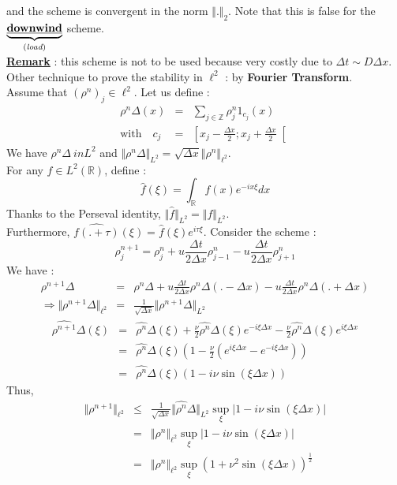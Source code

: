 \documentclass{report}
\newcommand{\R}{\ensuremath{\mathbb{R}}} %
\theoremstyle{plain}
\theoremstyle{definition}
\theoremstyle{remark}
\begin{document}
and the scheme is convergent in the norm $\Vert . \Vert_2$.
Note that this is false for the $\underbrace{\textbf{\underline{downwind}}}_{(\textit{load})}$ scheme.\\
\underline{\textbf{Remark}} : this scheme is not to be used because very costly due to $\Delta t \sim D\Delta x$.
Other technique to prove the stability in $\ell^2$ : by \textbf{Fourier Transform}.\\
Assume that $(\rho^n)_j \in \ell^2$.
Let us define : 
\begin{eqnarray}
\rho^n \Delta(x) &=& \sum_{j \in \mathbb{Z}} \rho^n_j \mathrm{1}_{c_j}(x) \\
\text{with}\quad c_j &=& \left[x_j - \frac{\Delta x}{2}; x_j + \frac{\Delta x}{2}\right[
\end{eqnarray}
We have $\rho^n \Delta \ in L^2$ and $\Vert \rho^n\Delta \Vert_{L^2} = \sqrt{\Delta x} \Vert \rho ^n \Vert_{\ell^2}$. \\
For any $f \in L^2(\R)$, define :
\begin{equation}
\hat{f}(\xi) = \int_{\R}f(x)e^{-ix\xi} dx
\end{equation}
Thanks to the Perseval identity, $\Vert \hat{f} \Vert_{L^2} =  \Vert f \Vert_{L^2}$.\\
Furthermore, $\hat{f(.+\tau)}(\xi) = \hat{f}(\xi)e^{i\tau\xi}$.
Consider the scheme :
\begin{equation}
\rho_j^{n+1} = \rho^n_j + u\frac{\Delta t}{2\Delta x}\rho^n_{j-1} - u\frac{\Delta t}{2\Delta x}\rho^n_{j+1} 
\end{equation}
We have :
\begin{eqnarray}
\rho^{n+1}\Delta &=& \rho^{n}\Delta + u\frac{\Delta t}{2\Delta x}\rho^n\Delta(.-\Delta x) - u\frac{\Delta t}{2\Delta x}\rho^n\Delta(.+\Delta x)\\
\Rightarrow \Vert \rho^{n+1}\Delta \Vert_{\ell^2} &=& \frac{1}{\sqrt{\Delta x}}\Vert \rho^{n+1}\Delta\Vert_{L^2} 
\end{eqnarray}
\begin{eqnarray}
\hat{\rho^{n+1}}\Delta(\xi) &=& \hat{\rho^{n}}\Delta(\xi) + \frac{\nu}{2}\hat{\rho^{n}}\Delta(\xi)e^{-i\xi\Delta x} - \frac{\nu}{2}\hat{\rho^{n}}\Delta(\xi)e^{i\xi\Delta x}\\
&=& \hat{\rho^n}\Delta(\xi)\left(1 - \frac{\nu}{2}(e^{i\xi\Delta x}-e^{-i\xi\Delta x})\right) \\
&=& \hat{\rho^n}\Delta(\xi)\left(1 - i\nu \sin(\xi\Delta x)\right)
\end{eqnarray} 
Thus, 
\begin{eqnarray}
\Vert \rho^{n+1} \Vert_{\ell^2} &\le & \frac{1}{\sqrt{\Delta x}}\Vert \hat{\rho^{n}}\Delta\Vert_{L^2} \sup_{\xi} \vert 1-i\nu \sin(\xi\Delta x)\vert \\
&=& \Vert \rho^n \Vert_{\ell^2} \sup_{\xi} \vert 1-i\nu \sin(\xi\Delta x)\vert \\
&=& \Vert \rho^n \Vert_{\ell^2} \sup_{\xi} \left(1+\nu^2 \sin(\xi\Delta x)\right)^{\frac{1}{2}}
\end{eqnarray}
\end{document}
